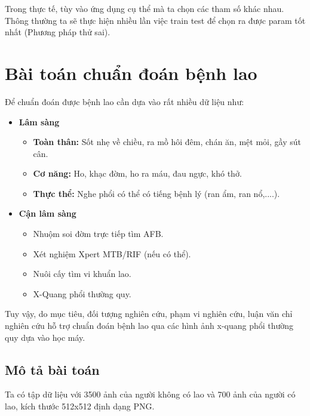 Trong thực tế, tùy vào ứng dụng cụ thể mà ta chọn các tham số khác nhau. Thông thường ta sẽ thực hiện nhiều lần việc train test để chọn ra được param tốt nhất (Phương pháp thử sai).

\section{Bài toán chuẩn đoán bệnh lao}
Để chuẩn đoán được bệnh lao cần dựa vào rất nhiều dữ liệu \cite{bytchuandoanlao} như: 
\begin{itemize}
	\item {\bfseries Lâm sàng}
	\begin{itemize}
		\item {\bfseries Toàn thân:} Sốt nhẹ về chiều, ra mồ hôi đêm, chán ăn, mệt mỏi, gầy sút cân.
		\item {\bfseries Cơ năng:} Ho, khạc đờm, ho ra máu, đau ngực, khó thở.
		\item {\bfseries Thực thể:} Nghe phổi có thể có tiếng bệnh lý (ran ẩm, ran nổ,....).
	\end{itemize}
	\item {\bfseries Cận lâm sàng}
	\begin{itemize}
		\item Nhuộm soi đờm trực tiếp tìm AFB.
		\item Xét nghiệm Xpert MTB/RIF (nếu có thể).
		\item Nuôi cấy tìm vi khuẩn lao.
		\item X-Quang phổi thường quy.
	\end{itemize}
\end{itemize}

Tuy vậy, do mục tiêu, đối tượng nghiên cứu, phạm vi nghiên cứu, luận văn chỉ nghiên cứu hỗ trợ chuẩn đoán bệnh lao qua các hình ảnh x-quang phổi thường quy dựa vào học máy.

\subsection{Mô tả bài toán}
Ta có tập dữ liệu với 3500 ảnh của người không có lao và 700 ảnh của người có lao, kích thước 512x512 định dạng PNG.